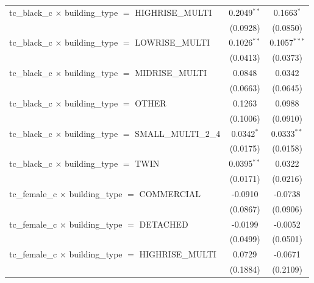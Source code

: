 \begin{tabular}{lcc}
   tc\_black\_c $\times$ building\_type $=$ HIGHRISE\_MULTI            & 0.2049$^{**}$   & 0.1663$^{*}$\\   
                                                                       & (0.0928)        & (0.0850)\\   
   tc\_black\_c $\times$ building\_type $=$ LOWRISE\_MULTI             & 0.1026$^{**}$   & 0.1057$^{***}$\\   
                                                                       & (0.0413)        & (0.0373)\\   
   tc\_black\_c $\times$ building\_type $=$ MIDRISE\_MULTI             & 0.0848          & 0.0342\\   
                                                                       & (0.0663)        & (0.0645)\\   
   tc\_black\_c $\times$ building\_type $=$ OTHER                      & 0.1263          & 0.0988\\   
                                                                       & (0.1006)        & (0.0910)\\   
   tc\_black\_c $\times$ building\_type $=$ SMALL\_MULTI\_2\_4         & 0.0342$^{*}$    & 0.0333$^{**}$\\   
                                                                       & (0.0175)        & (0.0158)\\   
   tc\_black\_c $\times$ building\_type $=$ TWIN                       & 0.0395$^{**}$   & 0.0322\\   
                                                                       & (0.0171)        & (0.0216)\\   
   tc\_female\_c $\times$ building\_type $=$ COMMERCIAL                & -0.0910         & -0.0738\\   
                                                                       & (0.0867)        & (0.0906)\\   
   tc\_female\_c $\times$ building\_type $=$ DETACHED                  & -0.0199         & -0.0052\\   
                                                                       & (0.0499)        & (0.0501)\\   
   tc\_female\_c $\times$ building\_type $=$ HIGHRISE\_MULTI           & 0.0729          & -0.0671\\   
                                                                       & (0.1884)        & (0.2109)\\   

\end{tabular}
